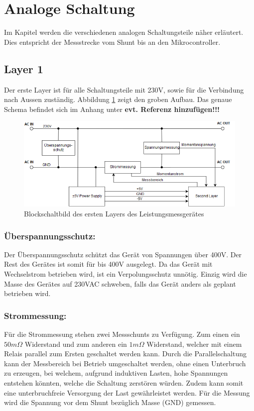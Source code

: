 
\section{Analoge Schaltung}
Im Kapitel werden die verschiedenen analogen Schaltungsteile näher erläutert. Dies entspricht der Messstrecke vom Shunt bis an den Mikrocontroller.
\subsection{Layer 1}%
Der erste Layer ist für alle Schaltungsteile mit 230V, sowie für die Verbindung nach Aussen zuständig. Abbildung \ref{fig:first_layer} zeigt den groben Aufbau. Das genaue Schema befindet sich im Anhang unter \textbf{evt. Referenz hinzufügen!!!}

\begin{figure}[H]
\begin{center}
\includegraphics[width=160mm]{images/first_layer.png}

	\caption{Blockschaltbild des ersten Layers des Leistungsmessgerätes} %
	\label{fig:first_layer}
\end{center}
\end{figure}

\subsubsection*{Überspannungsschutz:}
Der Überspannungsschutz schützt das Gerät von Spannungen über 400V. Der Rest des Gerätes ist somit für bis 400V ausgelegt. Da das Gerät mit Wechselstrom betrieben wird, ist ein Verpolungsschutz unnötig. Einzig wird die Masse des Gerätes auf 230VAC schweben, falls das Gerät anders als geplant betrieben wird.

\subsubsection*{Strommessung:}
Für die Strommessung stehen zwei Messschunts zu Verfügung. Zum einen ein $50m\Omega$ Widerstand und zum anderen ein $1m\Omega$ Widerstand, welcher mit einem Relais parallel zum Ersten geschaltet werden kann. Durch die Parallelschaltung kann der Messbereich bei Betrieb umgeschaltet werden, ohne einen Unterbruch zu erzeugen, bei welchem, aufgrund induktiven Lasten, hohe Spannungen entstehen könnten, welche die Schaltung zerstören würden. Zudem kann somit eine unterbruchfreie Versorgung der Last gewährleistet werden. Für die Messung wird die Spannung vor dem Shunt bezüglich Masse (GND) gemessen.

